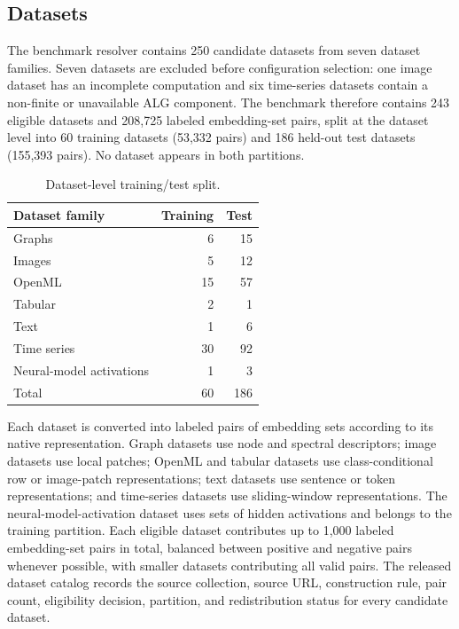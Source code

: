 \documentclass[preprint,12pt]{elsarticle}
\begin{document}
\subsection{Datasets}

The benchmark resolver contains 250 candidate datasets from seven
dataset families. Seven datasets are excluded before configuration selection:
one image dataset has an incomplete computation and six time-series datasets
contain a non-finite or unavailable ALG component. The benchmark
therefore contains 243 eligible datasets and 208,725 labeled embedding-set
pairs, split at the dataset level into 60 training datasets (53,332 pairs) and
186 held-out test datasets (155,393 pairs). No dataset appears in both
partitions.

\begin{table}[!htbp]
\centering
\caption{Dataset-level training/test split.}
\label{tab:partition}
\small
\begin{tabular}{lrr}
\toprule
Dataset family & Training & Test\\
\midrule
Graphs & 6 & 15\\
Images & 5 & 12\\
OpenML & 15 & 57\\
Tabular & 2 & 1\\
Text & 1 & 6\\
Time series & 30 & 92\\
Neural-model activations & 1 & 3\\
\midrule
Total & 60 & 186\\
\bottomrule
\end{tabular}
\end{table}

Each dataset is converted into labeled pairs of embedding sets according to its
native representation. Graph datasets use node and spectral descriptors; image
datasets use local patches; OpenML and tabular datasets use class-conditional
row or image-patch representations; text datasets use sentence or token
representations; and time-series datasets use sliding-window representations.
The neural-model-activation dataset uses sets of hidden activations and belongs
to the training partition. Each eligible
dataset contributes up to 1,000 labeled embedding-set pairs in total, balanced
between positive and negative pairs whenever possible, with smaller datasets
contributing all valid pairs. The released dataset catalog
records the source collection, source URL, construction rule, pair count,
eligibility decision, partition, and redistribution status for every candidate
dataset.
\end{document}
